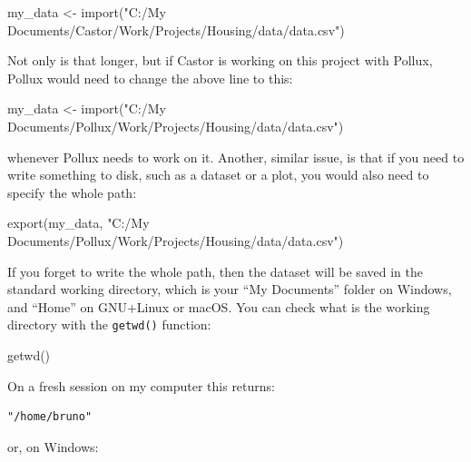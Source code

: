 \documentclass[
]{article}
\newenvironment{Shaded}{\begin{snugshade}}{\end{snugshade}}
\newcommand{\FunctionTok}[1]{\textcolor[rgb]{0.00,0.00,0.00}{#1}}
\newcommand{\NormalTok}[1]{#1}
\newcommand{\OtherTok}[1]{\textcolor[rgb]{0.56,0.35,0.01}{#1}}
\newcommand{\StringTok}[1]{\textcolor[rgb]{0.31,0.60,0.02}{#1}}
\begin{document}
\begin{Shaded}
\begin{Highlighting}[]
\NormalTok{my\_data }\OtherTok{\textless{}{-}} \FunctionTok{import}\NormalTok{(}\StringTok{"C:/My Documents/Castor/Work/Projects/Housing/data/data.csv"}\NormalTok{)}
\end{Highlighting}
\end{Shaded}

Not only is that longer, but if Castor is working on this project with Pollux, Pollux would need
to change the above line to this:

\begin{Shaded}
\begin{Highlighting}[]
\NormalTok{my\_data }\OtherTok{\textless{}{-}} \FunctionTok{import}\NormalTok{(}\StringTok{"C:/My Documents/Pollux/Work/Projects/Housing/data/data.csv"}\NormalTok{)}
\end{Highlighting}
\end{Shaded}

whenever Pollux needs to work on it. Another, similar issue, is that if you need to write something
to disk, such as a dataset or a plot, you would also need to specify the whole path:

\begin{Shaded}
\begin{Highlighting}[]
\FunctionTok{export}\NormalTok{(my\_data, }\StringTok{"C:/My Documents/Pollux/Work/Projects/Housing/data/data.csv"}\NormalTok{)}
\end{Highlighting}
\end{Shaded}

If you forget to write the whole path, then the dataset will be saved in the standard working
directory, which is your ``My Documents'' folder on Windows, and ``Home'' on GNU+Linux or macOS. You
can check what is the working directory with the \texttt{getwd()} function:

\begin{Shaded}
\begin{Highlighting}[]
\FunctionTok{getwd}\NormalTok{()}
\end{Highlighting}
\end{Shaded}

On a fresh session on my computer this returns:

\begin{verbatim}
"/home/bruno"
\end{verbatim}

or, on Windows:
\end{document}
